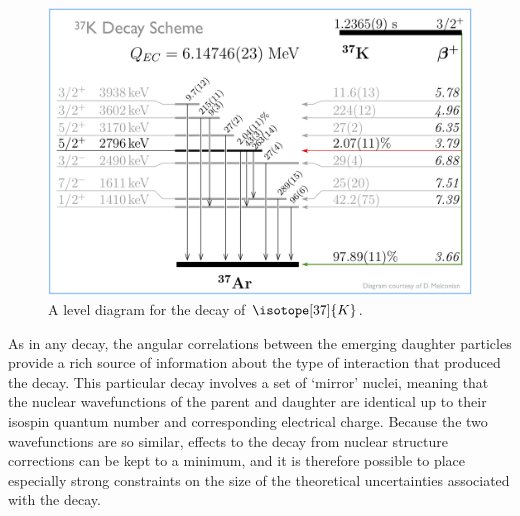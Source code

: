 \begin{figure}[h!tb]
	\centering
	\includegraphics[width=.999\linewidth]
	{Figures/NuclearLevelDiagram.png}
	\caption{A level diagram for the decay of $\isotope[37]{K}$.}	
	\label{fig:nuclearleveldiagram}
\end{figure}


As in any decay, the angular correlations between the emerging daughter particles provide a rich source of information about the type of interaction that produced the decay.  
This particular decay involves a set of `mirror' nuclei, meaning that the nuclear wavefunctions of the parent and daughter are identical up to their isospin quantum number and corresponding electrical charge.  Because the two wavefunctions are so similar, effects to the decay from nuclear structure corrections can be kept to a minimum, and it is therefore possible to place especially strong constraints on the size of the theoretical uncertainties associated with the decay.  





